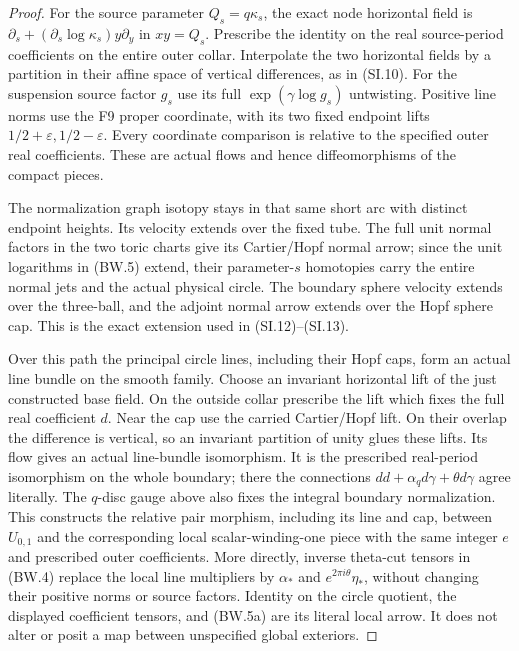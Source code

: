 \begin{proof}
For the source parameter \(Q_s=q\kappa_s\), the exact node horizontal
field is \(\partial_s+(\partial_s\log\kappa_s)y\partial_y\) in
\(xy=Q_s\). Prescribe the identity on the real source-period
coefficients on the entire outer collar. Interpolate the two
horizontal fields by a partition in their affine space of vertical
differences, as in (SI.10). For the suspension source factor \(g_s\)
use its full \(\exp(\gamma\log g_s)\) untwisting. Positive line norms
use the F9 proper coordinate, with its two fixed endpoint lifts
\(1/2+\varepsilon,1/2-\varepsilon\). Every coordinate comparison is
relative to the specified outer real coefficients. These are actual
flows and hence diffeomorphisms of the compact pieces.

The normalization graph isotopy stays in that same short arc with
distinct endpoint heights. Its velocity extends over the fixed tube.
The full unit normal factors in the two toric charts give its
Cartier/Hopf normal arrow; since the unit logarithms in (BW.5) extend,
their parameter-\(s\) homotopies carry the entire normal jets and the
actual physical circle. The boundary sphere velocity extends over
the three-ball, and the adjoint normal arrow extends over the Hopf
sphere cap. This is the exact extension used in (SI.12)--(SI.13).

Over this path the principal circle lines, including their Hopf caps,
form an actual line bundle on the smooth family. Choose an invariant
horizontal lift of the just constructed base field. On the outside
collar prescribe the lift which fixes the full real coefficient \(d\).
Near the cap use the carried Cartier/Hopf lift. On their overlap the
difference is vertical, so an invariant partition of unity glues
these lifts. Its flow gives an actual line-bundle isomorphism. It
is the prescribed real-period isomorphism on the whole boundary;
there the connections \(dd+\alpha_qd\gamma+\theta d\gamma\) agree
literally. The \(q\)-disc gauge above also fixes the integral boundary
normalization. This constructs the relative pair morphism, including
its line and cap, between \(U_{0,1}\) and the corresponding local
scalar-winding-one piece with the same integer \(e\) and prescribed
outer coefficients. More directly, inverse theta-cut tensors in
(BW.4) replace the local line multipliers by
\(\alpha_*\) and \(e^{2\pi i\theta}\eta_*\), without changing their
positive norms or source factors. Identity on the circle quotient,
the displayed coefficient tensors, and (BW.5a) are its literal
local arrow. It does not alter or posit a map between unspecified
global exteriors.


\end{proof}

